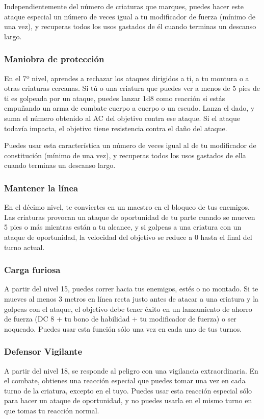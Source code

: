 \documentclass[a4paper,twocolumn,openany,10pt]{dndbook}
\begin{document}
Independientemente del número de criaturas que marques, puedes hacer este ataque especial un número de veces igual a tu
modificador de fuerza (mínimo de una vez), y recuperas todos los usos gastados de él cuando terminas un descanso largo.

\subsubsection{Maniobra de protección}
En el 7º nivel, aprendes a rechazar los ataques dirigidos a ti, a tu montura o a otras criaturas cercanas. Si tú o una criatura
que puedes ver a menos de 5 pies de ti es golpeada por un ataque, puedes lanzar 1d8 como reacción si estás empuñando un arma de
combate cuerpo a cuerpo o un escudo. Lanza el dado, y suma el número obtenido al AC del objetivo contra ese ataque. Si el ataque
todavía impacta, el objetivo tiene resistencia contra el daño del ataque.

Puedes usar esta característica un número de veces igual al de tu modificador de constitución (mínimo de una vez), y recuperas
todos los usos gastados de ella cuando terminas un descanso largo.

\subsubsection{Mantener la línea}
En el décimo nivel, te conviertes en un maestro en el bloqueo de tus enemigos. Las criaturas provocan un ataque de oportunidad
de tu parte cuando se mueven 5 pies o más mientras están a tu alcance, y si golpeas a una criatura con un ataque de oportunidad,
la velocidad del objetivo se reduce a 0 hasta el final del turno actual.

\subsubsection{Carga furiosa}
A partir del nivel 15, puedes correr hacia tus enemigos, estés o no montado. Si te mueves al menos 3 metros en línea recta justo
antes de atacar a una criatura y la golpeas con el ataque, el objetivo debe tener éxito en un lanzamiento de ahorro de fuerza
(DC 8 + tu bono de habilidad + tu modificador de fuerza) o ser noqueado. Puedes usar esta función sólo una vez en cada uno de
tus turnos. 

\subsubsection{Defensor Vigilante}
A partir del nivel 18, se responde al peligro con una vigilancia extraordinaria. En el combate, obtienes una reacción especial
que puedes tomar una vez en cada turno de la criatura, excepto en el tuyo. Puedes usar esta reacción especial sólo para hacer
un ataque de oportunidad, y no puedes usarla en el mismo turno en que tomas tu reacción normal. 
\end{document}
